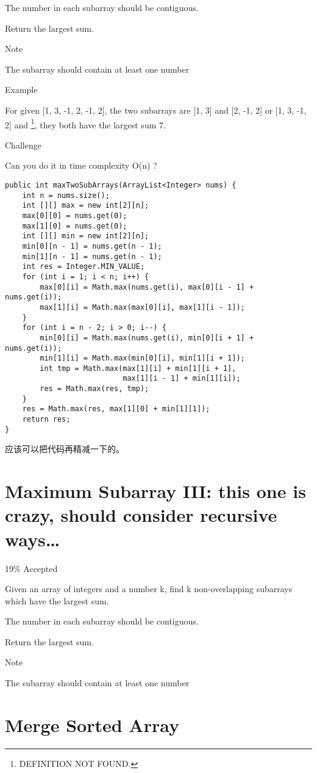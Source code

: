 \documentclass[12pt]{book}
\begin{document}
The number in each subarray should be contiguous.

Return the largest sum.

Note

The subarray should contain at least one number

Example

For given [1, 3, -1, 2, -1, 2], the two subarrays are [1, 3] and [2, -1, 2] or [1, 3, -1, 2] and \footnote{DEFINITION NOT FOUND.}, they both have the largest sum 7.

Challenge

Can you do it in time complexity O(n) ?
\lstset{language=java,label= ,caption= ,numbers=none}
\begin{lstlisting}
public int maxTwoSubArrays(ArrayList<Integer> nums) {
    int n = nums.size();
    int [][] max = new int[2][n];
    max[0][0] = nums.get(0);
    max[1][0] = nums.get(0);
    int [][] min = new int[2][n];
    min[0][n - 1] = nums.get(n - 1); 
    min[1][n - 1] = nums.get(n - 1);
    int res = Integer.MIN_VALUE;
    for (int i = 1; i < n; i++) {
        max[0][i] = Math.max(nums.get(i), max[0][i - 1] + nums.get(i));
        max[1][i] = Math.max(max[0][i], max[1][i - 1]);
    }
    for (int i = n - 2; i > 0; i--) {
        min[0][i] = Math.max(nums.get(i), min[0][i + 1] + nums.get(i));
        min[1][i] = Math.max(min[0][i], min[1][i + 1]);
        int tmp = Math.max(max[1][i] + min[1][i + 1],
                           max[1][i - 1] + min[1][i]);
        res = Math.max(res, tmp);
    }
    res = Math.max(res, max[1][0] + min[1][1]);
    return res;
}
\end{lstlisting}

应该可以把代码再精减一下的。
\chapter{Maximum Subarray III: this one is crazy, should consider recursive ways\ldots{}}
\label{sec-40}

19\% Accepted

Given an array of integers and a number k, find k non-overlapping subarrays which have the largest sum.

The number in each subarray should be contiguous.

Return the largest sum.

Note

The subarray should contain at least one number
\chapter{Merge Sorted Array}
\label{sec-41}
\end{document}
